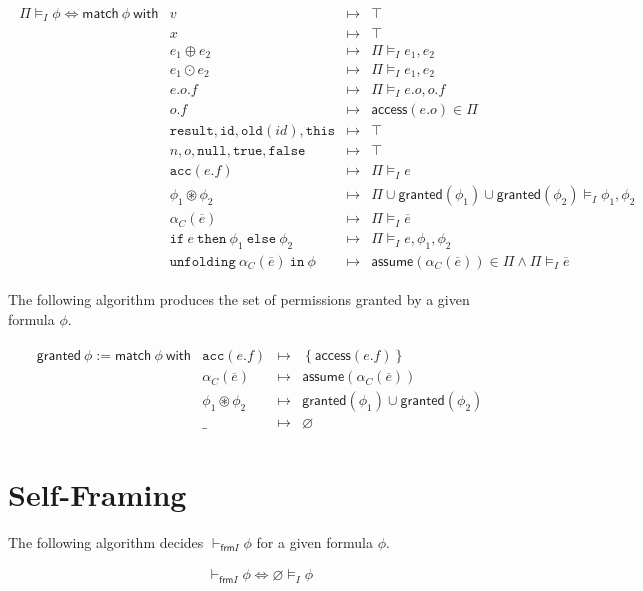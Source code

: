 \documentclass{article}
\newcommand{\tsf}{\textsf}
\newcommand{\tit}{\textit}
\newcommand{\ttt}{\texttt}
\newcommand{\access}{\tsf{access}}
\newcommand{\assume}{\tsf{assume}}
\newcommand{\frames}{\vDash_I}
\newcommand{\selfframes}{\vdash_{\tsf{frm}I}}
\newcommand{\mt}{\mapsto}
\newcommand{\set}[1]{\left\{ #1 \right\}}
\begin{document}
\begin{align*}
\begin{array}{r|lrl}
\Pi \frames \phi \iff \tsf{match} \ \phi \ \tsf{with}
& v &\mt& \top \\
& x &\mt& \top \\
& e_1 \oplus e_2 &\mt& \Pi \frames e_1, e_2 \\
& e_1 \odot e_2 &\mt& \Pi \frames e_1, e_2 \\
& e.o.f &\mt& \Pi \frames e.o, o.f \\
& o.f &\mt& \access(e.o) \in \Pi \\
& \ttt{result}, \ttt{id}, \ttt{old}(\tit{id}), \ttt{this} &\mt& \top \\
& n, o, \ttt{null}, \ttt{true}, \ttt{false} &\mt& \top \\
& \ttt{acc}(e.f) &\mt& \Pi \frames e \\
& \phi_1 \circledast \phi_2 &\mt& \Pi \cup \tsf{granted}(\phi_1) \cup \tsf{granted}(\phi_2) \frames \phi_1, \phi_2 \\
& \alpha_C(\overline{e}) &\mt& \Pi \frames \overline{e} \\
& \ttt{if} \ e \ \ttt{then} \ \phi_1 \ \ttt{else} \ \phi_2 &\mt& \Pi \frames e, \phi_1, \phi_2 \\
& \ttt{unfolding} \ \alpha_C(\overline{e}) \ \ttt{in} \ \phi &\mt& \assume(\alpha_C(\overline{e})) \in \Pi \land \Pi \frames \overline{e}
\end{array}
\end{align*}

The following algorithm produces the set of permissions granted by a given formula $\phi$.

\begin{align*}
\begin{array}{r|lrl}
\tsf{granted} \ \phi := \tsf{match} \ \phi \ \tsf{with}
& \ttt{acc}(e.f) &\mt& \set{ \access(e.f) } \\
& \alpha_C(\overline{e}) &\mt& \assume(\alpha_C(\overline{e})) \\
& \phi_1 \circledast \phi_2 &\mt& \tsf{granted}(\phi_1) \cup \tsf{granted}(\phi_2) \\
& \_ &\mt& \varnothing
\end{array}
\end{align*}

\section{Self-Framing}

The following algorithm decides $\selfframes \phi$ for a given formula $\phi$.

\begin{align*}
\selfframes \phi \iff \varnothing \frames \phi
\end{align*}
\end{document}
